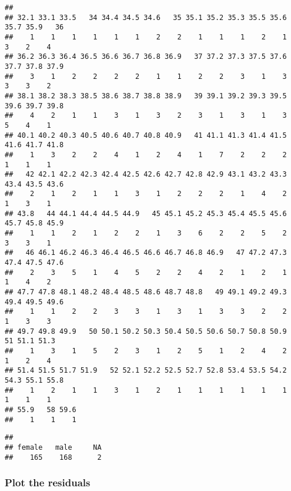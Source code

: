 \documentclass[
]{article}
\newenvironment{Shaded}{\begin{snugshade}}{\end{snugshade}}
\newcommand{\FunctionTok}[1]{\textcolor[rgb]{0.13,0.29,0.53}{\textbf{#1}}}
\newcommand{\NormalTok}[1]{#1}
\newcommand{\SpecialCharTok}[1]{\textcolor[rgb]{0.81,0.36,0.00}{\textbf{#1}}}
\begin{document}
\begin{verbatim}
## 
## 32.1 33.1 33.5   34 34.4 34.5 34.6   35 35.1 35.2 35.3 35.5 35.6 35.7 35.9   36 
##    1    1    1    1    1    1    2    2    1    1    1    2    1    3    2    4 
## 36.2 36.3 36.4 36.5 36.6 36.7 36.8 36.9   37 37.2 37.3 37.5 37.6 37.7 37.8 37.9 
##    3    1    2    2    2    2    1    1    2    2    3    1    3    3    3    2 
## 38.1 38.2 38.3 38.5 38.6 38.7 38.8 38.9   39 39.1 39.2 39.3 39.5 39.6 39.7 39.8 
##    4    2    1    1    3    1    3    2    3    1    3    1    3    5    4    1 
## 40.1 40.2 40.3 40.5 40.6 40.7 40.8 40.9   41 41.1 41.3 41.4 41.5 41.6 41.7 41.8 
##    1    3    2    2    4    1    2    4    1    7    2    2    2    1    1    1 
##   42 42.1 42.2 42.3 42.4 42.5 42.6 42.7 42.8 42.9 43.1 43.2 43.3 43.4 43.5 43.6 
##    2    1    2    1    1    3    1    2    2    2    1    4    2    1    3    1 
## 43.8   44 44.1 44.4 44.5 44.9   45 45.1 45.2 45.3 45.4 45.5 45.6 45.7 45.8 45.9 
##    1    1    2    1    2    2    1    3    6    2    2    5    2    3    3    1 
##   46 46.1 46.2 46.3 46.4 46.5 46.6 46.7 46.8 46.9   47 47.2 47.3 47.4 47.5 47.6 
##    2    3    5    1    4    5    2    2    4    2    1    2    1    1    4    2 
## 47.7 47.8 48.1 48.2 48.4 48.5 48.6 48.7 48.8   49 49.1 49.2 49.3 49.4 49.5 49.6 
##    1    1    2    2    3    3    1    3    1    3    3    2    2    1    3    3 
## 49.7 49.8 49.9   50 50.1 50.2 50.3 50.4 50.5 50.6 50.7 50.8 50.9   51 51.1 51.3 
##    1    3    1    5    2    3    1    2    5    1    2    4    2    1    2    4 
## 51.4 51.5 51.7 51.9   52 52.1 52.2 52.5 52.7 52.8 53.4 53.5 54.2 54.3 55.1 55.8 
##    1    2    1    1    3    1    2    1    1    1    1    1    1    1    1    1 
## 55.9   58 59.6 
##    1    1    1
\end{verbatim}

\begin{Shaded}
\end{Shaded}

\begin{verbatim}
## 
## female   male     NA 
##    165    168      2
\end{verbatim}

\subsubsection{Plot the residuals}\label{plot-the-residuals}
\end{document}

